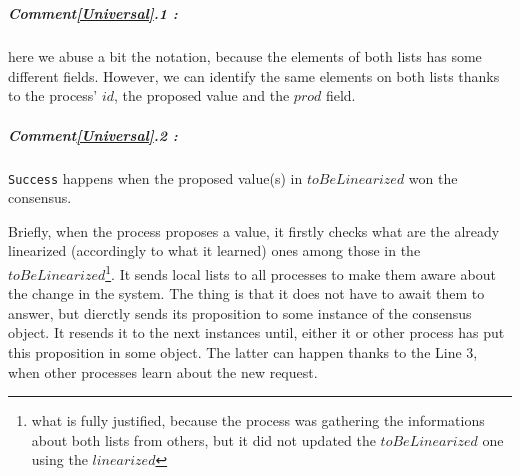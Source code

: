 \documentclass{article}
\begin{document}
\\
\subparagraph{Comment\ref{Universal}.1 :} here we abuse a bit the notation, because the elements of both lists has some different fields. However, we can identify the same elements on both lists thanks to the process' $id$, the proposed value and the $prod$ field.\\
\subparagraph{Comment\ref{Universal}.2 :} \texttt{Success} happens when the proposed value(s) in $toBeLinearized$ won the consensus.

Briefly, when the process proposes a value, it firstly checks what are the already linearized (accordingly to what it learned) ones among those in the $toBeLinearized$\footnote{what is fully justified, because the process was gathering the informations about both lists from others, but it did not updated the $toBeLinearized$ one using the $linearized$}. It sends local lists to all processes to make them aware about the change in the system. The thing is that it does not have to await them to answer, but dierctly sends its proposition to some instance of the consensus object. It resends it to the next instances until, either it or other process has put this proposition in some object. The latter can happen thanks to the Line 3, when other processes learn about the new request.
%
%
\end{document}
